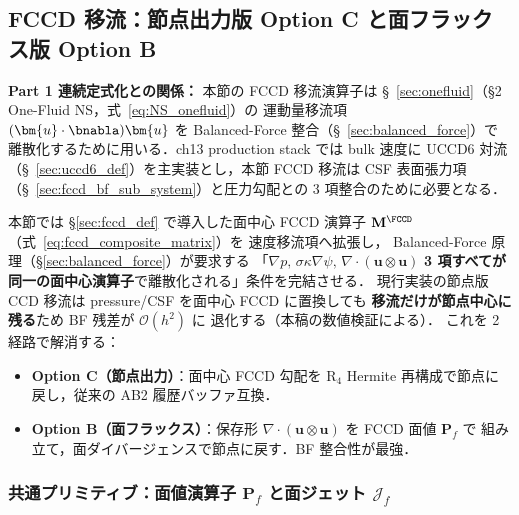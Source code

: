 %
%
\subsection{FCCD 移流：節点出力版 Option C と面フラックス版 Option B}
\label{sec:fccd_advection}

\noindent\textbf{Part 1 連続定式化との関係：}
本節の FCCD 移流演算子は §~\ref{sec:onefluid}（§2 One-Fluid NS，式~\eqref{eq:NS_onefluid}）の
運動量移流項 $(\bm{u}\cdot\bnabla)\bm{u}$ を Balanced-Force 整合（§~\ref{sec:balanced_force}）で
離散化するために用いる．ch13 production stack では bulk 速度に UCCD6 対流
（§~\ref{sec:uccd6_def}）を主実装とし，本節 FCCD 移流は CSF 表面張力項
（§~\ref{sec:fccd_bf_sub_system}）と圧力勾配との 3 項整合のために必要となる．

本節では \S\ref{sec:fccd_def} で導入した面中心 FCCD 演算子
$\mathbf{M}^{\FCCD}$（式~\eqref{eq:fccd_composite_matrix}）を
速度移流項へ拡張し，
Balanced-Force 原理（\S\ref{sec:balanced_force}）が要求する
「$\nabla p,\,\sigma\kappa\nabla\psi,\,\nabla\cdot(\mathbf{u}\otimes\mathbf{u})$
\textbf{3 項すべてが同一の面中心演算子}で離散化される」条件を完結させる．
現行実装の節点版 CCD 移流は pressure/CSF を面中心 FCCD に置換しても
\textbf{移流だけが節点中心に残る}ため BF 残差が $\mathcal{O}(h^2)$ に
退化する（本稿の数値検証による）．
これを 2 経路で解消する：
\begin{itemize}
  \item \textbf{Option C（節点出力）}：面中心 FCCD 勾配を R$_4$
        Hermite 再構成で節点に戻し，従来の AB2 履歴バッファ互換．
  \item \textbf{Option B（面フラックス）}：保存形
        $\nabla\cdot(\mathbf{u}\otimes\mathbf{u})$ を FCCD 面値 $\mathbf{P}_f$ で
        組み立て，面ダイバージェンスで節点に戻す．BF 整合性が最強．
\end{itemize}

\subsubsection{\texorpdfstring{共通プリミティブ：面値演算子 $\mathbf{P}_f$ と面ジェット $\mathcal{J}_f$}{共通プリミティブ：面値演算子 P\_f と面ジェット J\_f}}
\label{sec:fccd_adv_primitives}

